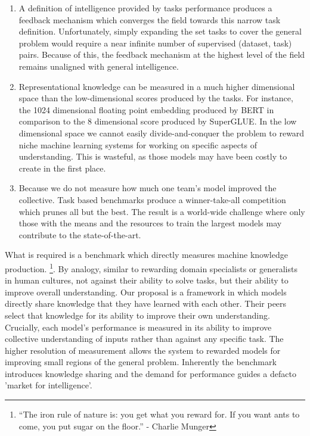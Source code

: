 \documentclass{article}
\begin{document}
\begin{enumerate}
	\item A definition of intelligence provided by tasks performance produces a feedback mechanism which converges the field towards this narrow task definition. Unfortunately, simply expanding the set tasks to cover the general problem would require a near infinite number of supervised (dataset, task) pairs.  \cite{radford2019language} Because of this, the feedback mechanism at the highest level of the field remains unaligned with general intelligence. \cite{chollet2019measure}
	
	\item Representational knowledge can be measured in a much higher dimensional space than the low-dimensional scores produced by the tasks. For instance, the 1024 dimensional floating point embedding produced by BERT in comparison to the 8 dimensional score produced by SuperGLUE. In the low dimensional space we cannot easily divide-and-conquer the problem to reward niche machine learning systems for working on specific aspects of understanding. This is wasteful, as those models may have been costly to create in the first place.
	
	\item Because we do not measure how much one team's model improved the collective. Task based benchmarks produce a winner-take-all competition which prunes all but the best. The result is a world-wide challenge where only those with the means and the resources to train the largest models may contribute to the state-of-the-art. 
\end{enumerate}

What is required is a benchmark which directly measures machine knowledge production. \footnote{“The iron rule of nature is: you get what you reward for. If you want ants to come, you put sugar on the floor.” - Charlie Munger}. By analogy, similar to rewarding domain specialists or generalists in human cultures, not against their ability to solve tasks, but their ability to improve overall understanding. Our proposal is a framework in which models directly share knowledge that they have learned with each other. Their peers select that knowledge for its ability to improve their own understanding. Crucially, each model's performance is measured in its ability to improve collective understanding of inputs rather than against any specific task. The higher resolution of measurement allows the system to rewarded models for improving small regions of the general problem. Inherently the benchmark introduces knowledge sharing and the demand for performance guides a defacto 'market for intelligence'.   
\smallskip
\end{document}
